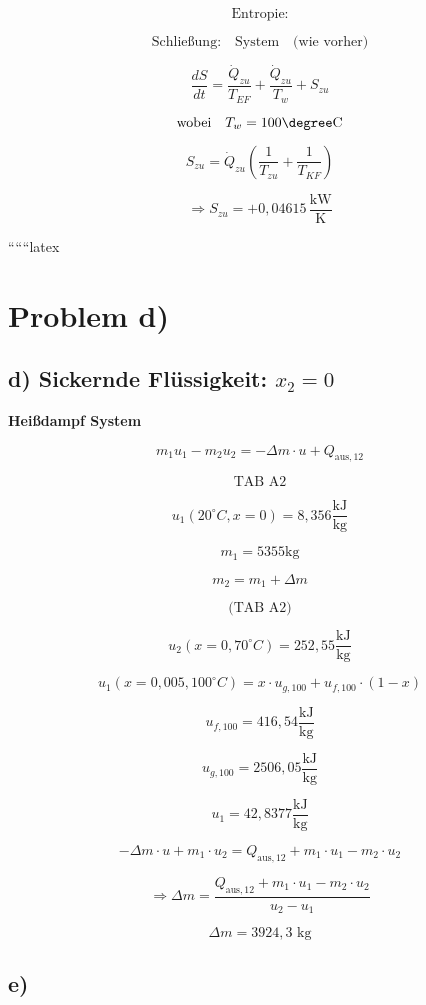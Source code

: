 \[
\text{Entropie:}
\]

\[
\text{Schließung:} \quad \text{System} \quad \text{(wie vorher)}
\]

\[
\frac{dS}{dt} = \frac{\dot{Q}_{zu}}{T_{EF}} + \frac{\dot{Q}_{zu}}{T_w} + S_{zu}
\]

\[
\text{wobei} \quad T_w = 100 \degree \text{C}
\]

\[
S_{zu} = \dot{Q}_{zu} \left( \frac{1}{T_{zu}} + \frac{1}{T_{KF}} \right)
\]

\[
\Rightarrow S_{zu} = +0,04615 \, \frac{\text{kW}}{\text{K}}
\]

``````latex


\section*{Problem d)}

\subsection*{d) Sickernde Flüssigkeit: $x_2 = 0$}

\textbf{Heißdampf System}

\[
m_1 u_1 - m_2 u_2 = -\Delta m \cdot u + Q_{\text{aus},12}
\]

\[
\text{TAB A2}
\]

\[
u_1 (20^\circ C, x = 0) = 8,356 \frac{\text{kJ}}{\text{kg}}
\]

\[
m_1 = 5355 \text{kg}
\]

\[
m_2 = m_1 + \Delta m
\]

\[
\text{(TAB A2)}
\]

\[
u_2 (x = 0, 70^\circ C) = 252,55 \frac{\text{kJ}}{\text{kg}}
\]

\[
u_1 (x = 0,005, 100^\circ C) = x \cdot u_{g,100} + u_{f,100} \cdot (1-x)
\]

\[
u_{f,100} = 416,54 \frac{\text{kJ}}{\text{kg}}
\]

\[
u_{g,100} = 2506,05 \frac{\text{kJ}}{\text{kg}}
\]

\[
u_1 = 42,8377 \frac{\text{kJ}}{\text{kg}}
\]

\[
-\Delta m \cdot u + m_1 \cdot u_2 = Q_{\text{aus},12} + m_1 \cdot u_1 - m_2 \cdot u_2
\]

\[
\Rightarrow \Delta m = \frac{Q_{\text{aus},12} + m_1 \cdot u_1 - m_2 \cdot u_2}{u_2 - u_1}
\]

\[
\Delta m = 3924,3 \text{ kg}
\]

\subsection*{e)}

